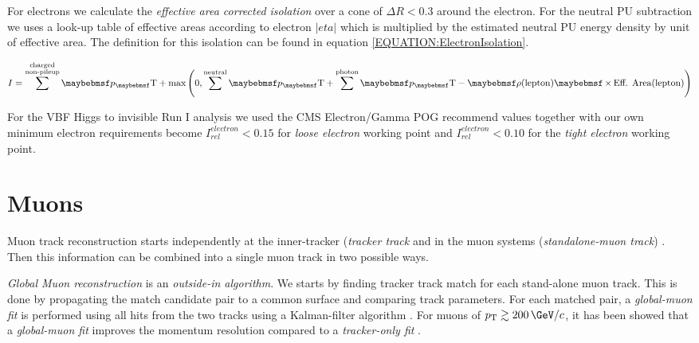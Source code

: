 For electrons we calculate the \textit{effective area corrected isolation} over a cone of $\Delta R<0.3$ around the electron. For the neutral \gls{PU} subtraction we uses a look-up table of effective areas according to electron $|eta|$ which is multiplied by the estimated neutral \gls{PU} energy density by unit of effective area. The definition for this isolation can be found in equation \ref{EQUATION:ElectronIsolation}.

\begin{equation}
I = \sum^{\substack{\text{charged} \\ \text{non-pileup}}}\pT +
\text{max}\left(0,\sum^{\text{neutral}}\pT+\sum^{\text{photon}}\pT - \rho(\text{lepton}) \times \text{Eff. Area}(\text{lepton})\right)
\label{EQUATION:ElectronIsolation}
\end{equation}

For the \gls{VBF} Higgs to invisible Run I analysis we used the \gls{CMS} Electron/Gamma \gls{POG} recommend values together with our own minimum electron \pt requirements become $I_{rel}^{electron}<0.15$ for \textit{loose electron} working point and $I_{rel}^{electron}<0.10$ for the \textit{tight electron} working point.

\section{Muons}
\label{SECTION:EventReconstructionPhysicsObjects_Muons}


Muon track reconstruction starts independently at the inner-tracker (\textit{tracker track} and in the muon systems (\textit{standalone-muon track}) \cite{ARTICLE:CMSMuonReconstruction7TeV}. Then this information can be combined into a single muon track in two possible ways.

\textit{Global Muon reconstruction} is an \textit{outside-in algorithm}. We starts by finding tracker track match for each stand-alone muon track. This is done by propagating the match candidate pair to a common surface and comparing track parameters. For each matched pair, a \textit{global-muon fit} is performed using all hits from the two tracks using a Kalman-filter algorithm \cite{ARTICLE:KalmanFilteringTrackVertexFitting}. For muons of $\pt\gtrsim 200\,\GeV/c$, it has been showed that a \textit{global-muon fit} improves the momentum resolution compared to a \textit{tracker-only fit} \cite{CMSTDR:CMSPhysicsVol1, ARTICLE:CMSPerformanceMuonReconstructionCosmicRay}.

